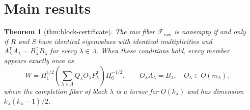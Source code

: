 \documentclass{article}
\newtheorem{theorem}{Theorem}
\begin{document}
\section{Main results}

\begin{theorem}[thm:block-certificate]\label{thm:block-certificate}
The raw fiber \(\mathcal F_{\mathrm{raw}}\) is nonempty if and only if \(R\) and \(S\) have identical eigenvalues with identical multiplicities and \(A_\lambda^{\mathsf T}A_\lambda=B_\lambda^{\mathsf T}B_\lambda\) for every \(\lambda\in\Lambda\). When these conditions hold, every member appears exactly once as \[W=H_1^{1/2}\left(\sum_{\lambda\in\Lambda}Q_\lambda O_\lambda P_\lambda^{\mathsf T}\right)H_0^{-1/2},\qquad O_\lambda A_\lambda=B_\lambda,\quad O_\lambda\in O(m_\lambda),\] where the completion fiber of block \(\lambda\) is a torsor for \(O(k_\lambda)\) and has dimension \(k_\lambda(k_\lambda-1)/2\).
\end{theorem}
\end{document}
